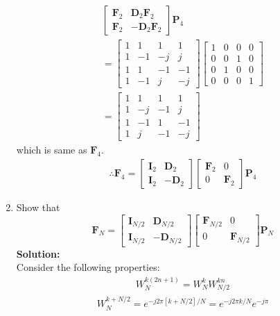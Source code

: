 \documentclass[journal,12pt,twocolumn]{IEEEtran}
\newcommand{\solution}{\noindent \textbf{Solution: }}
\providecommand{\brak}[1]{\ensuremath{\left(#1\right)}}
\providecommand{\sbrak}[1]{\ensuremath{\left[#1\right]}}
\let\vec\mathbf
\numberwithin{equation}{section}
\renewcommand\thesection{\arabic{section}}
\begin{document}
\begin{enumerate}[label=\arabic*.,ref=\thesection.\theenumi]
\begin{align}
\begin{bmatrix}
\vec{F}_{2} & \vec{D}_{2}\vec{F}_{2} \\
\vec{F}_{2} & -\vec{D}_{2}\vec{F}_{2}
\end{bmatrix}\vec{P}_{4}\\
=\begin{bmatrix}
1&1&1&1\\1&-1&-j&j\\1&1&-1&-1\\1&-1&j&-j
\end{bmatrix}\begin{bmatrix}
1&0&0&0\\0&0&1&0\\0&1&0&0\\0&0&0&1
\end{bmatrix}\\
=\begin{bmatrix}
1&1&1&1\\1&-j&-1&j\\1&-1&1&-1\\1&j&-1&-j
\end{bmatrix}
\end{align}
which is same as $\vec{F}_4$.
\begin{align}
\therefore \vec{F}_{4}=
\begin{bmatrix}
	\vec{I}_{2} & \vec{D}_{2} \\
\vec{I}_{2} & -\vec{D}_{2}
\end{bmatrix}
\begin{bmatrix}
\vec{F}_{2} & 0 \\
0 & \vec{F}_{2}
\end{bmatrix}
\vec{P}_{4}
\end{align}
\item Show that 
\begin{equation}
\vec{F}_{N}=
\begin{bmatrix}
\vec{I}_{N/2} & \vec{D}_{N/2} \\
\vec{I}_{N/2} & -\vec{D}_{N/2}
\end{bmatrix}
\begin{bmatrix}
\vec{F}_{N/2} & 0 \\
0 & \vec{F}_{N/2}
\end{bmatrix}
\vec{P}_{N}
\end{equation}
\solution \\
Consider the following properties:
\begin{align}
W_N^{k\brak{2n+1}}=W_N^{k}W_{N/2}^{kn}
\end{align}
\begin{align}
\label{eq:periodicity}
W_N^{k+N/2}=e^{- j 2 \pi \sbrak{k+N/2} / N }=e^{- j 2 \pi k / N }e^{- j \pi}\\

\end{align}
\end{enumerate}
\end{document}
